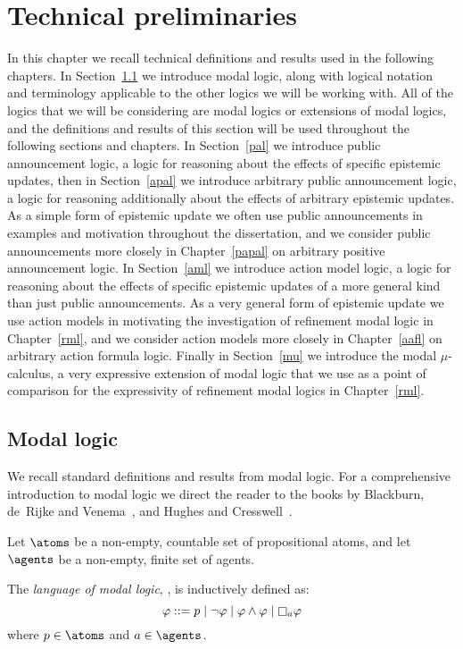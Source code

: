 \chapter{Technical preliminaries}\label{technical}

In this chapter we recall technical definitions and results used in the following chapters.
In Section~\ref{ml} we introduce modal logic, along with logical notation and terminology applicable to the other logics we will be working with.
All of the logics that we will be considering are modal logics or extensions of modal logics, and the definitions and results of this section will be used throughout the following sections and chapters. 
In Section~\ref{pal} we introduce public announcement logic, a logic for reasoning about the effects of specific epistemic updates, then in Section~\ref{apal} we introduce arbitrary public announcement logic, a logic for reasoning additionally about the effects of arbitrary epistemic updates.
As a simple form of epistemic update we often use public announcements in examples and motivation throughout the dissertation, and we consider public announcements more closely in Chapter~\ref{papal} on arbitrary positive announcement logic.
In Section~\ref{aml} we introduce action model logic, a logic for reasoning about the effects of specific epistemic updates of a more general kind than just public announcements.
As a very general form of epistemic update we use action models in motivating the investigation of refinement modal logic in Chapter~\ref{rml}, and we consider action models more closely in Chapter~\ref{aafl} on arbitrary action formula logic.
Finally in Section~\ref{mu} we introduce the modal $\mu$-calculus, a very expressive extension of modal logic that we use as a point of comparison for the expressivity of refinement modal logics in Chapter~\ref{rml}.

\section{Modal logic}\label{ml}

We recall standard definitions and results from modal logic.
For a comprehensive introduction to modal logic we direct the reader to the books by Blackburn, de~Rijke and Venema~\cite{blackburn:2001}, and Hughes and Cresswell~\cite{hughes:1996}.

Let $\atoms$ be a non-empty, countable set of propositional atoms, and
let $\agents$ be a non-empty, finite set of agents.

\begin{definition}
The {\em language of modal logic}, \langMl{}, is inductively defined as:
$$
\phi ::= 
    \atomP \mid
    \lnot \phi \mid
    \phi \land \phi \mid
    \necessaryA \phi
$$
where $\atomP \in \atoms$ and $\agentA \in \agents$.
\end{definition}


